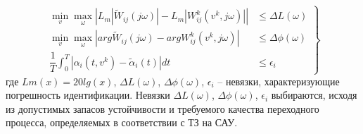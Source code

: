 \begin{enumerate}
	\begin{equation}
	\label{eq:p2:10-}
	\left. %
	\begin{aligned}
	\min_v \max_\omega \left| L_m\left| \tilde{W}_{ij}(j\omega) \right| - L_m\left| {W}^k_{ij}(v^k, j\omega) \right| \right| &\leq \varDelta L(\omega) \\
	\min_v \max_\omega \left| arg \tilde{W}_{ij}(j\omega) - arg {W}^k_{ij}(v^k, j\omega) \right| &\leq \varDelta \phi(\omega) \\
	\dfrac{1}{T}\int^T_0\left| \alpha_i(t,v^k)- \tilde{\alpha}_i(t) \right| dt &\leq \epsilon_i
	\end{aligned}\right\}
	\end{equation}
	где $Lm(x)=20lg(x)$, $\varDelta L(\omega)$, $\varDelta \phi(\omega)$, $\epsilon_i$ – невязки, характеризующие погрешность идентификации. Невязки $\varDelta L(\omega)$, $\varDelta \phi(\omega)$, $\epsilon_i$ выбираются, исходя из допустимых запасов устойчивости и требуемого качества переходного процесса, определяемых в соответствии с ТЗ на САУ.
	
\end{enumerate}

